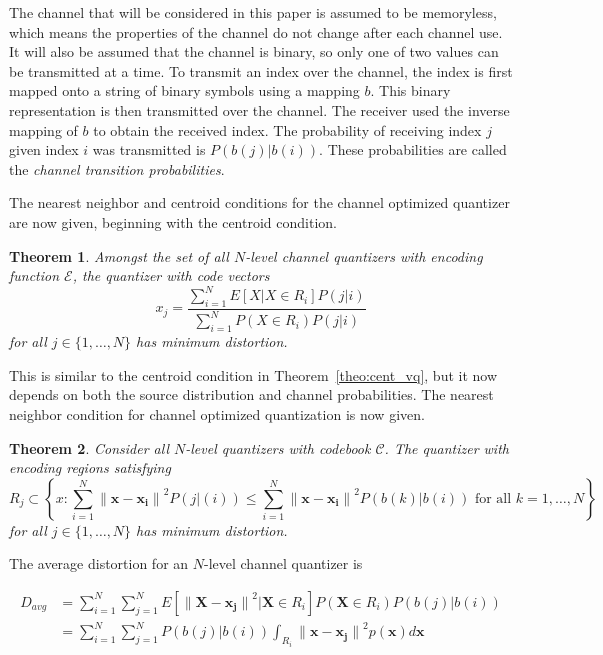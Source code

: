 \documentclass[10pt]{article}
\newtheorem{theorem}{Theorem}[section]
\begin{document}
The channel that will be considered in this paper is assumed to be memoryless, which means the properties of the channel do not change after each channel use. It will also be assumed that the channel is binary, so only one of two values can be transmitted at a time. To transmit an index over the channel, the index is first mapped onto a string of binary symbols using a mapping $b$. This binary representation is then transmitted over the channel. The receiver used the inverse mapping of $b$ to obtain the received index. The probability of receiving index $j$ given index $i$ was transmitted is $P(b(j)|b(i))$. These probabilities are called the \emph{channel transition probabilities}.

The nearest neighbor and centroid conditions for the channel optimized quantizer are now given, beginning with the centroid condition.

\begin{theorem}
\label{theo:cent_covq}
Amongst the set of all $N$-level channel quantizers with encoding function $\mathcal{E}$, the quantizer with code vectors
\begin{equation}
  \label{eq:cent_covq}
  x_j = \frac{\sum_{i=1}^N E[X | X \in R_i]P(j|i)}{\sum_{i=1}^N P( X \in R_i)P(j|i)} 
\end{equation}
for all $j \in \{1,\ldots,N\}$ has minimum distortion.
\end{theorem}
This is similar to the centroid condition in Theorem~\ref{theo:cent_vq}, but it now depends on both the source distribution and channel probabilities. The nearest neighbor condition for channel optimized quantization is now given.

\begin{theorem}
Consider all $N$-level quantizers with codebook $\mathcal{C}$. The quantizer with encoding regions satisfying
\begin{equation}
R_j \subset \left\{x : \sum_{i=1}^N {\| \mathbf{x} - \mathbf{x_i} \|}^2P(j|(i)) \le \sum_{i=1}^N {\| \mathbf{x} - \mathbf{x_i} \|}^2P(b(k)|b(i)) \text{ for all } k = 1,\ldots,N \right\}
\end{equation}
for all $j \in \{1,\ldots,N\}$ has minimum distortion.
\end{theorem}

The average distortion for an $N$-level channel quantizer is

\begin{align}
D_{avg} &= \sum_{i=1}^{N} \sum_{j=1}^{N} E[ {\|\mathbf{X} - \mathbf{x_j}\|}^2 | \mathbf{X} \in R_i] P(\mathbf{X} \in R_i) P(b(j)|b(i))\\
&= \sum_{i=1}^{N} \sum_{j=1}^{N} P(b(j)|b(i)) \int_{R_i} {\|\mathbf{x} - \mathbf{x_j}\|}^2 p(\mathbf{x}) d\mathbf{x}
\end{align}
\end{document}
